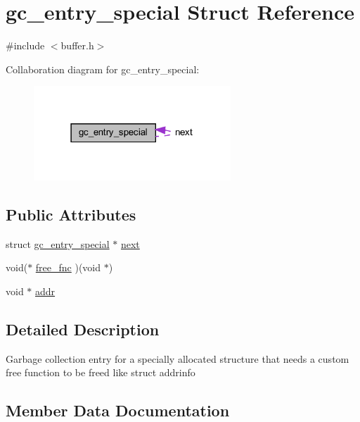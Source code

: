 \hypertarget{structgc__entry__special}{}\section{gc\+\_\+entry\+\_\+special Struct Reference}
\label{structgc__entry__special}


{\ttfamily \#include $<$buffer.\+h$>$}



Collaboration diagram for gc\+\_\+entry\+\_\+special\+:
\nopagebreak
\begin{figure}[H]
\begin{center}
\leavevmode
\includegraphics[width=210pt]{structgc__entry__special__coll__graph}
\end{center}
\end{figure}
\subsection*{Public Attributes}
\begin{DoxyCompactItemize}
\item 
struct \hyperlink{structgc__entry__special}{gc\+\_\+entry\+\_\+special} $\ast$ \hyperlink{structgc__entry__special_af951f02db6b8edbc95620f638bb7c8b6}{next}
\item 
void($\ast$ \hyperlink{structgc__entry__special_a6564f5d117211f869ba53423979c10bf}{free\+\_\+fnc} )(void $\ast$)
\item 
void $\ast$ \hyperlink{structgc__entry__special_a8572c27b2f891e2a44432687a7481599}{addr}
\end{DoxyCompactItemize}


\subsection{Detailed Description}
Garbage collection entry for a specially allocated structure that needs a custom free function to be freed like struct addrinfo 

\subsection{Member Data Documentation}
\hypertarget{structgc__entry__special_a8572c27b2f891e2a44432687a7481599}{}
